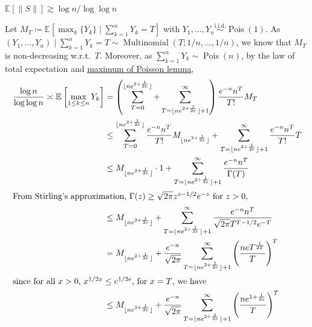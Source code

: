 \begin{answer}
\begin{enumerate}[(a)]
		      \begin{claim}
			      \(\mathbb{E}_{}[\lVert S \rVert ] \gtrsim \log n / \log \log n\)
		      \end{claim}
		      \begin{explanation}
			      Let \(M_T \coloneqq \mathbb{E}_{}[\max _k \{ Y_k \} \mid \sum_{k=1}^{n} Y_k = T ] \) with \(Y_1, \dots , Y_n \overset{\text{i.i.d.} }{\sim } \operatorname{Pois}(1) \). As \((Y_1, \dots , Y_n) \mid \sum_{k=1}^{n} Y_k = T \sim \operatorname{Multinomial}(T; 1 / n, \dots , 1 / n) \), we know that \(M_T\) is non-decreasing w.r.t.\ \(T\). Moreover, as \(\sum_{k=1}^{n} Y_k \sim \operatorname{Pois}(n) \), by the law of total expectation and \hyperref[lma:maximum-Poisson]{maximum of Poisson lemma},
			      \begin{align*}
				      \frac{\log n}{\log \log n}
				      \asymp \mathbb{E}_{}\left[\max _{1 \leq k \leq n} Y_k\right]
				       & = \left( \sum_{T=0}^{\lfloor n e^{2 + \frac{1}{2e}} \rfloor } + \sum_{T= \lfloor n e^{2 + \frac{1}{2e}} \rfloor + 1}^{\infty} \right) \frac{e^{-n} n^T}{T!} M_T                                                     \\
				       & \leq \sum_{T=0}^{\lfloor n e^{2 + \frac{1}{2e}} \rfloor } \frac{e^{-n} n^T}{T!} M_{\lfloor n e^{2 + \frac{1}{2e}} \rfloor } + \sum_{T= \lfloor n e^{2 + \frac{1}{2e}} \rfloor + 1}^{\infty} \frac{e^{-n} n^T}{T!} T \\
				       & \leq M_{\lfloor n e^{2 + \frac{1}{2e}} \rfloor } \cdot 1 + \sum_{T= \lfloor n e^{2 + \frac{1}{2e}} \rfloor + 1}^{\infty} \frac{e^{-n} n^T}{\Gamma (T)}                                                              \\
				      \shortintertext{From Stirling's approximation, \(\Gamma (z) \geq \sqrt{2\pi } z^{z - 1 / 2} e^{-z} \) for \(z > 0\),}
				       & \leq M_{\lfloor n e^{2 + \frac{1}{2e}} \rfloor } + \sum_{T= \lfloor n e^{2 + \frac{1}{2e}} \rfloor + 1}^{\infty} \frac{e^{-n} n^T}{\sqrt{2\pi } T^{T - 1 / 2} e^{-T}}                                               \\
				       & = M_{\lfloor n e^{2 + \frac{1}{2e}} \rfloor } + \frac{e^{-n}}{\sqrt{2\pi } } \sum_{T= \lfloor n e^{2 + \frac{1}{2e}} \rfloor + 1}^{\infty} \left( \frac{n e T^{\frac{1}{2T}}}{T} \right) ^T                         \\
				      \shortintertext{since for all \(x > 0\), \(x^{1 / 2x} \leq e^{1 / 2e}\), for \(x = T\), we have}
				       & \leq M_{\lfloor n e^{2 + \frac{1}{2e}} \rfloor } + \frac{e^{-n}}{\sqrt{2\pi } } \sum_{T= \lfloor n e^{2 + \frac{1}{2e}} \rfloor + 1}^{\infty} \left( \frac{n e^{1 + \frac{1}{2e}}}{T} \right) ^T                    \\

\end{align*}
\end{explanation}
\end{enumerate}
\end{answer}
